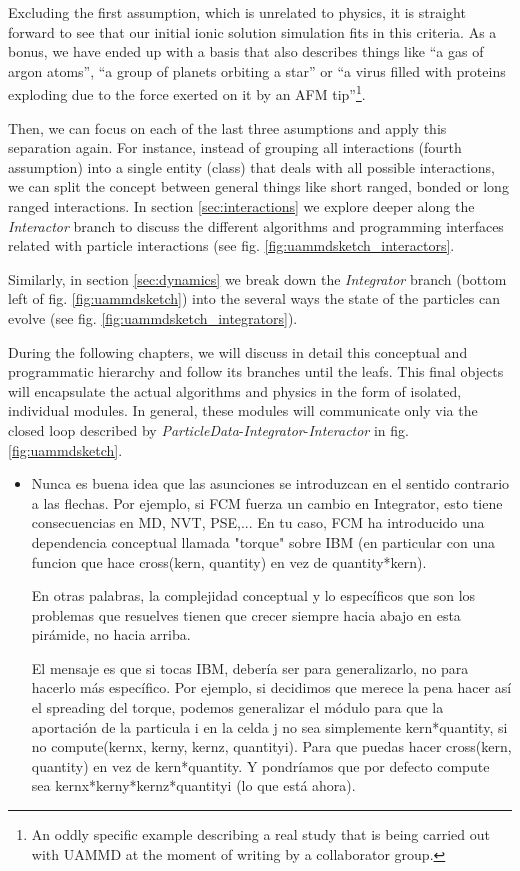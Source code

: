 \documentclass[ twoside,openright,titlepage,numbers=noenddot,%
headinclude,footinclude,cleardoublepage=empty,abstract=on,
BCOR=5mm,paper=a4,fontsize=11pt, dvipsnames
]{scrreprt}
\newcommand{\uammd}{\gls{UAMMD}\xspace}
\begin{document}
Excluding the first assumption, which is unrelated to physics, it is straight forward to see that our initial ionic solution simulation fits in this criteria. As a bonus, we have ended up with a basis that also describes things like ``a gas of argon atoms'', ``a group of planets orbiting a star'' or ``a virus filled with proteins exploding due to the force exerted on it by an AFM tip''\footnote{An oddly specific example describing a real study that is being carried out with \uammd at the moment of writing by a collaborator group.}.


Then, we can focus on each of the last three asumptions and apply this separation again. For instance, instead of grouping all interactions (fourth assumption) into a single entity (class) that deals with all possible interactions, we can split the concept between general things like short ranged, bonded or long ranged interactions. In section \ref{sec:interactions} we explore deeper along the \emph{Interactor} branch to discuss the different algorithms and programming interfaces related with particle interactions (see fig. \ref{fig:uammdsketch_interactors}.

Similarly, in section \ref{sec:dynamics} we break down the \emph{Integrator} branch (bottom left of fig. \ref{fig:uammdsketch}) into the several ways the state of the particles can evolve (see fig. \ref{fig:uammdsketch_integrators}).

During the following chapters, we will discuss in detail this conceptual and programmatic hierarchy and follow its branches until the leafs. This final objects will encapsulate the actual algorithms and physics in the form of isolated, individual modules. In general, these modules will communicate only via the closed loop described by \emph{ParticleData}-\emph{Integrator}-\emph{Interactor} in fig. \ref{fig:uammdsketch}.

\begin{itemize}
\item Nunca es buena idea que las asunciones se introduzcan en el sentido contrario a las flechas. Por ejemplo, si FCM fuerza un cambio en Integrator, esto tiene consecuencias en MD, NVT, PSE,... En tu caso, FCM ha introducido una dependencia conceptual llamada "torque" sobre IBM (en particular con una funcion que hace cross(kern, quantity) en vez de quantity*kern).

En otras palabras, la complejidad conceptual y lo específicos que son los problemas que resuelves tienen que crecer siempre hacia abajo en esta pirámide, no hacia arriba.

El mensaje es que si tocas IBM, debería ser para generalizarlo, no para hacerlo más específico. Por ejemplo, si decidimos que merece la pena hacer así el spreading del torque, podemos generalizar el módulo para que la aportación de la particula i en la celda j no sea simplemente kern*quantity, si no compute(kernx, kerny, kernz, quantityi). Para que puedas hacer cross(kern, quantity) en vez de kern*quantity. Y pondríamos que por defecto compute sea kernx*kerny*kernz*quantityi (lo que está ahora).
\end{itemize}
\end{document}
